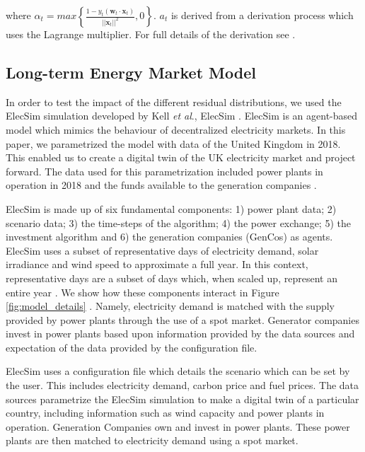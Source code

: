\documentclass[final,3p,times,twocolumn,numbers]{elsarticle}
\begin{document}
\noindent where $\alpha_t=max\left\{\frac{1-y_t(\boldsymbol{w}_t\cdot\boldsymbol{x}_t)}{\left|\left|\boldsymbol{x}_t\right|\right|^2},0\right\}$. $a_t$ is derived from a derivation process which uses the Lagrange multiplier. For full details of the derivation see \cite{Gzik2014}.

\subsection{Long-term Energy Market Model}


In order to test the impact of the different residual distributions, we used the ElecSim simulation developed by Kell \textit{et al}., ElecSim \cite{Kell,Kell2020}. ElecSim is an agent-based model which mimics the behaviour of decentralized electricity markets. In this paper, we parametrized the model with data of the United Kingdom in 2018. This enabled us to create a digital twin of the UK electricity market and project forward. The data used for this parametrization included power plants in operation in 2018 and the funds available to the generation companies \cite{dukes_511, companies_house}.

ElecSim is made up of six fundamental components: 1) power plant data; 2) scenario data; 3) the time-steps of the algorithm; 4) the power exchange; 5) the investment algorithm and 6) the generation companies (GenCos) as agents. ElecSim uses a subset of representative days of electricity demand, solar irradiance and wind speed to approximate a full year. In this context, representative days are a subset of days which, when scaled up, represent an entire year \cite{Kell2020}. We show how these components interact in Figure \ref{fig:model_details} \cite{Kell}. Namely, electricity demand is matched with the supply provided by power plants through the use of a spot market. Generator companies invest in power plants based upon information provided by the data sources and expectation of the data provided by the configuration file. 



ElecSim uses a configuration file which details the scenario which can be set by the user. This includes electricity demand, carbon price and fuel prices. The data sources parametrize the ElecSim simulation to make a digital twin of a particular country, including information such as wind capacity and power plants in operation. Generation Companies own and invest in power plants. These power plants are then matched to electricity demand using a spot market.
\end{document}
